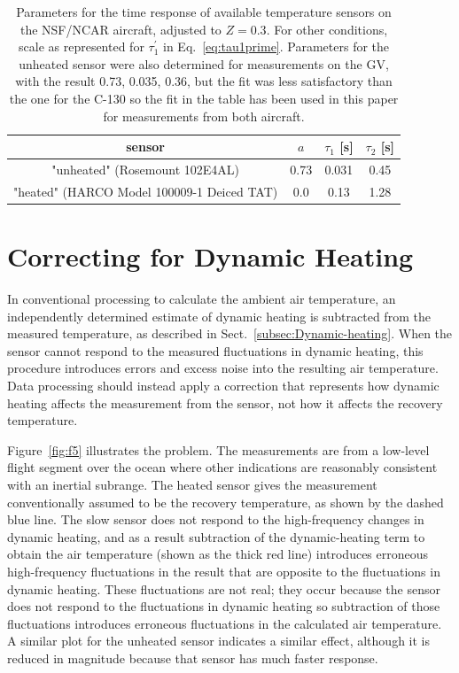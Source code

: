\documentclass[amt, manuscript]{copernicus}
\begin{document}
\begin{table}[t]
\caption{Parameters for the time response of available temperature sensors
on the NSF/NCAR aircraft, adjusted to $Z=0.3$. For other conditions,
scale as represented for $\tau_{1}^{\prime}$ in 
Eq.\ \eqref{eq:tau1prime}. Parameters for the unheated sensor were also determined for measurements on the GV, with the result {0.73, 0.035, 0.36},
but the fit was less satisfactory than the one for the C-130 
so the fit in the table has been used in this paper for measurements from both aircraft.{\label{tab:Parameters}}}
\begin{tabular}{|c|c|c|c|}
\hline 
\bf{sensor} & $a$ & $\tau_{1}$ [s] & $\tau_{2}$ [s]\tabularnewline
\hline 
\hline 
"unheated" (Rosemount 102E4AL) & 0.73 & 0.031 & 0.45\tabularnewline
\hline 
"heated" (HARCO Model 100009-1 Deiced TAT)& 0.0 & 0.13 & 1.28\tabularnewline
\hline 
\end{tabular}
\end{table}

\section{\texorpdfstring{Correcting for Dynamic
Heating\label{sec:Correcting-for-Dynamic}}{Correcting for Dynamic Heating}}

In conventional processing to calculate the ambient air temperature, an
independently determined estimate of dynamic heating is subtracted from
the measured temperature, as described in
Sect.~\ref{subsec:Dynamic-heating}. When the sensor cannot respond to
the measured fluctuations in dynamic heating, this procedure introduces
errors and excess noise into the resulting air temperature. Data
processing should instead apply a correction that represents how dynamic
heating affects the measurement from the sensor, not how it affects the
recovery temperature.

Figure~\ref{fig:f5} illustrates the problem. The measurements are from a
low-level flight segment over the ocean where other indications are
reasonably consistent with an inertial subrange. The heated sensor gives
the measurement conventionally assumed to be the recovery temperature,
as shown by the dashed blue line. The slow sensor does not respond to
the high-frequency changes in dynamic heating, and as a result
subtraction of the dynamic-heating term to obtain the air temperature
(shown as the thick red line) introduces erroneous high-frequency
fluctuations in the result that are opposite to the fluctuations in
dynamic heating. These fluctuations are not real; they occur because the
sensor does not respond to the fluctuations in dynamic heating so
subtraction of those fluctuations introduces erroneous fluctuations in
the calculated air temperature. A similar plot for the unheated sensor
indicates a similar effect, although it is reduced in magnitude because
that sensor has much faster response.
\end{document}
